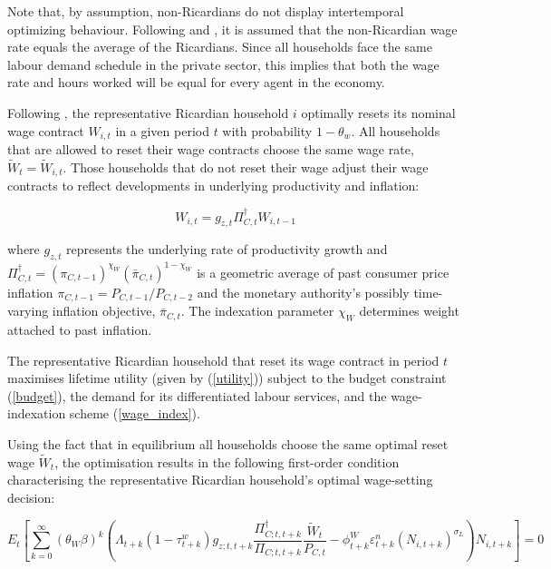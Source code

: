 \documentclass[a4paper,11pt]{article}
\numberwithin{equation}{section}
\begin{document}
	Note that, by assumption, non-Ricardians do not display intertemporal optimizing behaviour. Following \cite{erceg2006} and \cite{forni2009}, it is assumed that the non-Ricardian wage rate equals the average of the Ricardians. Since all households face the same labour demand schedule in the private sector, this implies that both the wage rate and hours worked will be equal for every agent in the economy.
	
	Following \cite{calvo1983}, the representative Ricardian household $i$ optimally resets its nominal wage contract $W_{i,t}$ in a given period $t$ with probability $1-\theta_w$. All households that are allowed to reset their wage contracts choose the same wage rate, $\widetilde{W}_t = \widetilde{W}_{i,t}$. Those households that do not reset their wage adjust their wage contracts to reflect developments in underlying productivity and inflation:
	
	\begin{equation} \label{wage_index}
	W_{i,t}=g_{z,t}\Pi_{C,t}^{\dagger}W_{i,t-1}
	\end{equation} 
	
	where $g_{z,t}$ represents the underlying rate of productivity growth and $\Pi_{C,t}^{\dagger}=\left(\pi_{C,t-1}\right)^{\chi_W}\allowbreak\left(\bar{\pi}_{C,t}\right)^{1-\chi_W}$ is a geometric average of past consumer price inflation $\pi_{C,t-1}=P_{C,t-1}/P_{C,t-2}$ and the monetary authority's possibly time-varying inflation objective, $\bar{\pi}_{C,t}$. The indexation parameter $\chi_W$ determines weight attached to past inflation.
	
	The representative Ricardian household that reset its wage contract in period $t$ maximises lifetime utility (given by (\ref{utility})) subject to the budget constraint (\ref{budget}), the demand for its differentiated labour services, and the wage-indexation scheme (\ref{wage_index}).
	
	Using the fact that in equilibrium all households choose the same optimal reset wage $\widetilde{W}_t$, the optimisation results in the following first-order condition characterising the representative Ricardian household's optimal wage-setting decision:
	
	\begin{equation} \label{foc_wh}
	E_t\left[\sum_{k=0}^{\infty}\left(\theta_W\beta\right)^k\left(\Lambda_{t+k}(1-\tau_{t+k}^w)g_{z;t,t+k}\frac{\Pi^{\dagger}_{C;t,t+k}}{\Pi_{C;t,t+k}}\frac{\widetilde{W}_t}{P_{C,t}}-\phi_{t+k}^W\varepsilon_{t+k}^n\left(N_{i,t+k}\right)^{\sigma_L}\right)N_{i,t+k}\right]=0
	\end{equation}
	
\end{document}
